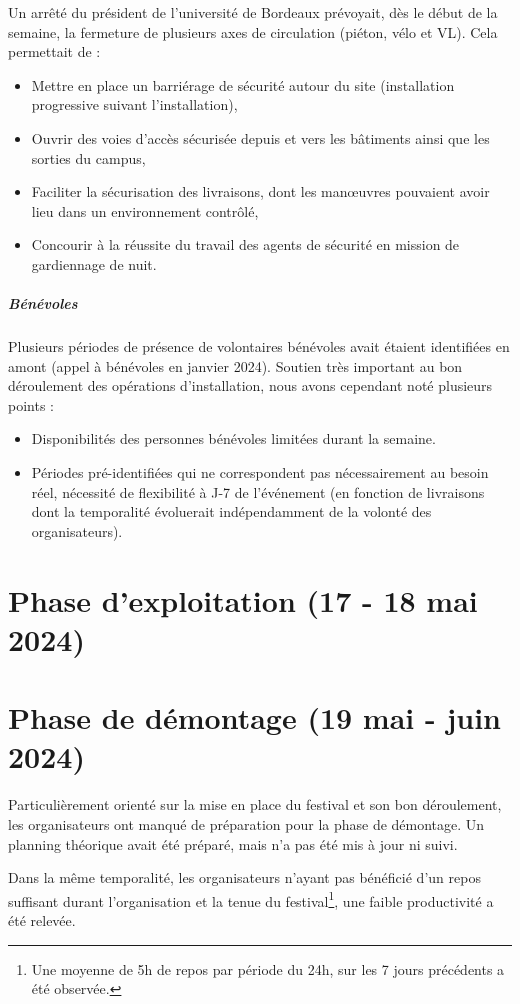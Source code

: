 \documentclass[12pt,a4paper]{report}
\begin{document}
Un arrêté du président de l'université de Bordeaux prévoyait, dès le début de la semaine, la fermeture de plusieurs axes de circulation (piéton, vélo et VL). Cela permettait de :
\begin{itemize}
\item Mettre en place un barriérage de sécurité autour du site (installation progressive suivant l'installation),
\item Ouvrir des voies d'accès sécurisée depuis et vers les bâtiments ainsi que les sorties du campus,
\item Faciliter la sécurisation des livraisons, dont les manœuvres pouvaient avoir lieu dans un environnement contrôlé,
\item Concourir à la réussite du travail des agents de sécurité en mission de gardiennage de nuit.
\end{itemize}

\subparagraph{Bénévoles}

Plusieurs périodes de présence de volontaires bénévoles avait étaient identifiées en amont (appel à bénévoles en janvier 2024). Soutien très important au bon déroulement des opérations d'installation, nous avons cependant noté plusieurs points : 
\begin{itemize}
\item Disponibilités des personnes bénévoles limitées durant la semaine.
\item Périodes pré-identifiées qui ne correspondent pas nécessairement au besoin réel, nécessité de flexibilité à J-7 de l'événement (en fonction de livraisons dont la temporalité évoluerait indépendamment de la volonté des organisateurs).
\end{itemize}

\section{Phase d'exploitation (17 - 18 mai 2024)}
\vfill

\section{Phase de démontage (19 mai - juin 2024)}

Particulièrement orienté sur la mise en place du festival et son bon déroulement, les organisateurs ont manqué de préparation pour la phase de démontage. Un planning théorique avait été préparé, mais n'a pas été mis à jour ni suivi.

Dans la même temporalité, les organisateurs n'ayant pas bénéficié d'un repos suffisant durant l'organisation et la tenue du festival\footnote{Une moyenne de 5h de repos par période du 24h, sur les 7 jours précédents a été observée.}, une faible productivité a été relevée.
\end{document}
